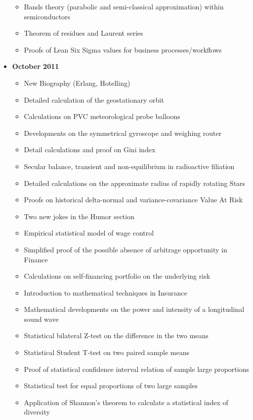 \documentclass[12pt,a4paper,twoside,openright]{report}
\theoremstyle{definition}
\theoremstyle{itexmp}
\numberwithin{equation}{section}
\begin{document}
\begin{itemize}
\begin{itemize}[noitemsep]
				\item Bands theory (parabolic and semi-classical approximation) within semiconductors
				\item Theorem of residues and Laurent series
				\item Proofs of Lean Six Sigma values for business processes/workflows
			\end{itemize}
		\item \textbf{October 2011}
			\begin{itemize}[noitemsep]
				\item New Biography (Erlang, Hotelling)
				\item Detailed calculation of the geostationary orbit
				\item Calculations on PVC meteorological probe balloons
				\item Developments on the symmetrical gyroscope and weighing router
				\item Detail calculations and proof on Gini index
				\item Secular balance, transient and non-equilibrium in radioactive filiation
				\item Detailed calculations on the approximate radius of rapidly rotating Stars
				\item Proofs on historical delta-normal and variance-covariance Value At Risk
				\item Two new jokes in the Humor section
				\item Empirical statistical model of wage control
				\item Simplified proof of the possible absence of arbitrage opportunity in Finance
				\item Calculations on self-financing portfolio on the underlying risk
				\item Introduction to mathematical techniques in Insurance
				\item Mathematical developments on the power and intensity of a longitudinal sound wave
				\item Statistical bilateral Z-test on the difference in the two means
				\item Statistical Student T-test on two paired sample means
				\item Proof of statistical confidence interval relation of sample large proportions
				\item Statistical test for equal proportions of two large samples
				\item Application of Shannon's theorem to calculate a statistical index of diversity

\end{itemize}
\end{itemize}
\end{document}
